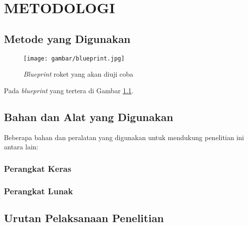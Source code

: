 \chapter{METODOLOGI}


\section{Metode yang Digunakan}

\lipsum[11]

\begin{figure} [H] \centering
  \texttt{[image: gambar/blueprint.jpg]}
  \caption{\emph{Blueprint} roket yang akan diuji coba \parencite{SpaceXBlueprint}}
  \label{fig:Blueprint}
\end{figure}

Pada \emph{blueprint} yang tertera di Gambar \ref{fig:Blueprint}. \lipsum[12]

\section{Bahan dan Alat yang Digunakan}

Beberapa bahan dan peralatan yang digunakan untuk mendukung penelitian ini antara lain:

\subsection{Perangkat Keras}
\lipsum[13]

\subsection{Perangkat Lunak}
\lipsum[14]

\section{Urutan Pelaksanaan Penelitian}

\lipsum[17]

